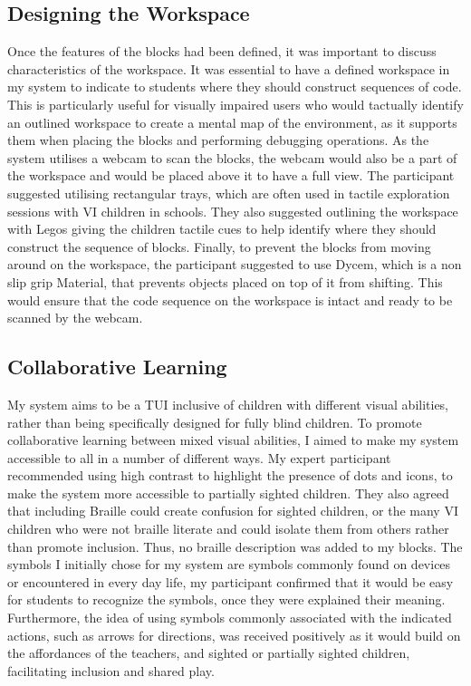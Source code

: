 \documentclass[oneside,%
                    author={Malak Hajji},
                    degree={BSc},
                    title={Designing An Accessible Computational Toolkit For Students},
                  subtitle={With Mixed Visual Abilities}]{dissertation}
\begin{document}
\subsection{Designing the Workspace}
Once the features of the blocks had been defined, it was important to discuss characteristics of the workspace. It was essential to have a defined workspace in my system to indicate to students where they should construct sequences of code. This is particularly useful for visually impaired users who would tactually identify an outlined workspace to create a mental map of the environment, as it supports them when placing the blocks and performing debugging operations. As the system utilises a webcam to scan the blocks, the webcam would also be a part of the workspace and would be placed above it to have a full view. The participant suggested utilising rectangular trays, which are often used in tactile exploration sessions with VI children in schools. They also suggested outlining the workspace with Legos giving the children tactile cues to help identify where they should construct the sequence of blocks.
Finally, to prevent the blocks from moving around on the workspace, the participant suggested to use Dycem, which is a non slip grip Material, that prevents objects placed on top of it from shifting. This would ensure that the code sequence on the workspace is intact and ready to be scanned by the webcam.

\subsection{Collaborative Learning}
My system aims to be a TUI inclusive of children with different visual abilities, rather than being specifically designed for fully blind children. To promote collaborative learning between mixed visual abilities, I aimed to make my system accessible to all in a number of different ways. My expert participant recommended using high contrast to highlight the presence of dots and icons, to make the system more accessible to partially sighted children. They also agreed that including Braille could create confusion for sighted children, or the many VI children who were not braille literate and could isolate them from others rather than promote inclusion. Thus, no braille description was added to my blocks.
The symbols I initially chose for my system are symbols commonly found on devices or encountered in every day life, my participant confirmed that it would be easy for students to recognize the symbols, once they were explained their meaning. Furthermore, the idea of using symbols commonly associated with the indicated actions, such as arrows for directions, was received positively as it would build on the affordances of the teachers, and sighted or partially sighted children, facilitating inclusion and shared play.
\end{document}
